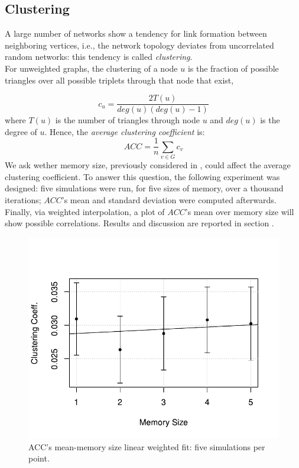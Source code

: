 \subsection{Clustering} \label{clustering}
A large number of networks show a tendency for link formation
between neighboring vertices, i.e., the network topology deviates
from uncorrelated random networks: this tendency is called
\textit{clustering}.\cite{clusterarticle}\\
For unweighted graphs, the clustering of a node $u$ is the fraction
of possible triangles over all possible triplets
through that node that exist,\cite{clustersite}

\begin{equation}
\label{eq:clustering}
c_u = \frac{2 T(u)}{deg(u)(deg(u)-1)}
\end{equation}
where $T(u)$ is the number of triangles through node $u$ and $deg(u)$ is the degree of $u$.
Hence, the \textit{average clustering coefficient}  is:
\begin{equation}
\label{eq:averageclustering}
ACC = \frac{1}{n}\sum_{v \in G} c_v
\end{equation}
We ask wether memory size, previously considered in
, could affect the average clustering coefficient.
To answer this question, the following experiment was designed:
five simulations were run, for five sizes of memory, over a thousand
iterations; $ACC$'s mean and standard deviation were computed
afterwards.\\
Finally, via weighted interpolation, a plot of $ACC$'s mean
over memory size will show possible  correlations.
Results and discussion are reported in section .
\begin{figure}[h]
  \centering
  \includegraphics[trim={0cm 0cm 0cm 1cm},clip,width=.8\columnwidth]{img/clustering.pdf}
  \caption{ACC's mean-memory size linear weighted fit: five simulations per point.\label{fig:clustering}}
\end{figure}
